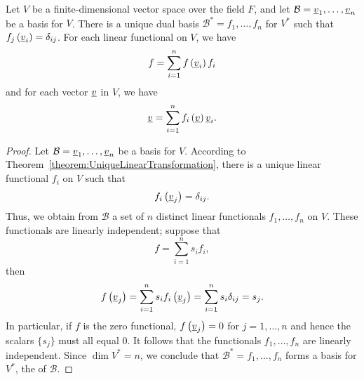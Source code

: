 \begin{theorem}
Let $V$ be a finite-dimensional vector space over the field $F$, and let $\mathcal{B} = \underline{v}_1, \ldots, \underline{v}_n$ be a basis for $V$.
There is a unique dual basis $\mathcal{B}^* = f_1, \ldots, f_n$ for $V^*$ such that $f_j \left( \underline{v}_i \right) = \delta_{ij}$.
For each linear functional on $V$, we have
\begin{equation*}
f = \sum_{i=1}^n f \left( \underline{v}_i \right) f_i
\end{equation*}
and for each vector $\underline{v}$ in $V$, we have
\begin{equation*}
\underline{v} = \sum_{i=1}^n f_i \left( \underline{v} \right) \underline{v}_i .
\end{equation*}
\end{theorem}
\begin{proof}
Let $\mathcal{B} = \underline{v}_1, \ldots, \underline{v}_n$ be a basis for $V$.
According to Theorem~\ref{theorem:UniqueLinearTransformation}, there is a unique linear functional $f_i$ on $V$ such that
\begin{equation*}
f_i \left( \underline{v}_j \right) = \delta_{ij} .
\end{equation*}
Thus, we obtain from $\mathcal{B}$ a set of $n$ distinct linear functionals $f_1, \ldots, f_n$ on $V$.
These functionals are linearly independent;
suppose that
\begin{equation*}
f = \sum_{i=1}^n s_i f_i ,
\end{equation*}
then
\begin{equation*}
f \left( \underline{v}_j \right) = \sum_{i=1}^n s_i f_i \left( \underline{v}_j \right)
= \sum_{i=1}^n s_i \delta_{ij} = s_j .
\end{equation*}
In particular, if $f$ is the zero functional, $f \left( \underline{v}_j \right) = 0$ for $j = 1, \ldots, n$ and hence the scalars $\{ s_j \}$ must all equal $0$.
It follows that the functionals $f_1, \ldots, f_n$ are linearly independent.
Since $\dim V^* = n$, we conclude that $\mathcal{B}^* = f_1, \ldots, f_n$ forms a basis for $V^*$, the  of $\mathcal{B}$.


\end{proof}
